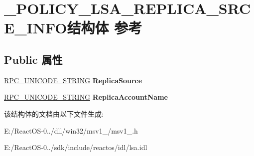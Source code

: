 \hypertarget{struct___p_o_l_i_c_y___l_s_a___r_e_p_l_i_c_a___s_r_c_e___i_n_f_o}{}\section{\+\_\+\+P\+O\+L\+I\+C\+Y\+\_\+\+L\+S\+A\+\_\+\+R\+E\+P\+L\+I\+C\+A\+\_\+\+S\+R\+C\+E\+\_\+\+I\+N\+F\+O结构体 参考}
\label{struct___p_o_l_i_c_y___l_s_a___r_e_p_l_i_c_a___s_r_c_e___i_n_f_o}
\subsection*{Public 属性}
\begin{DoxyCompactItemize}
\item 
\mbox{\label{struct___p_o_l_i_c_y___l_s_a___r_e_p_l_i_c_a___s_r_c_e___i_n_f_o_aa17066f56606ec9dcc37d1aa173405c9}} 
\hyperlink{struct___r_p_c___u_n_i_c_o_d_e___s_t_r_i_n_g}{R\+P\+C\+\_\+\+U\+N\+I\+C\+O\+D\+E\+\_\+\+S\+T\+R\+I\+NG} {\bfseries Replica\+Source}
\item 
\mbox{\label{struct___p_o_l_i_c_y___l_s_a___r_e_p_l_i_c_a___s_r_c_e___i_n_f_o_a73e28d519808cde093ec08e2eb0bc351}} 
\hyperlink{struct___r_p_c___u_n_i_c_o_d_e___s_t_r_i_n_g}{R\+P\+C\+\_\+\+U\+N\+I\+C\+O\+D\+E\+\_\+\+S\+T\+R\+I\+NG} {\bfseries Replica\+Account\+Name}
\end{DoxyCompactItemize}


该结构体的文档由以下文件生成\+:\begin{DoxyCompactItemize}
\item 
E\+:/\+React\+O\+S-\/0../dll/win32/msv1\+\_/msv1\+\_.\+h\item 
E\+:/\+React\+O\+S-\/0../sdk/include/reactos/idl/lsa.\+idl\end{DoxyCompactItemize}
